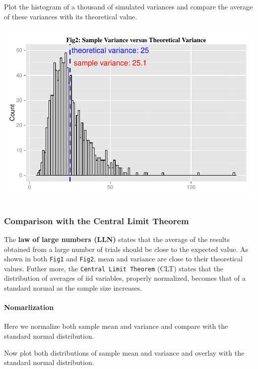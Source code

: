\documentclass[]{article}
\begin{document}
Plot the histogram of a thousand of simulated variances and compare the
average of these variances with its theoretical value.

\includegraphics{PA1pdf_files/figure-latex/unnamed-chunk-5-1.pdf}

\subsubsection{Comparison with the Central Limit
Theorem}\label{comparison-with-the-central-limit-theorem}

The \textbf{law of large numbers (LLN)} states that the average of the
results obtained from a large number of trials should be close to the
expected value. As shown in both \texttt{Fig1} and \texttt{Fig2}, mean
and variance are close to their theoretical values. Futher more, the
\texttt{Central\ Limit\ Theorem} (CLT) states that the distribution of
averages of iid variables, properly normalized, becomes that of a
standard normal as the sample size increases.

\paragraph{Nomarlization}\label{nomarlization}

Here we normalize both sample mean and variance and compare with the
standard normal distribution.

Now plot both distributions of sample mean and variance and overlay with
the standard normal distribution.
\end{document}
